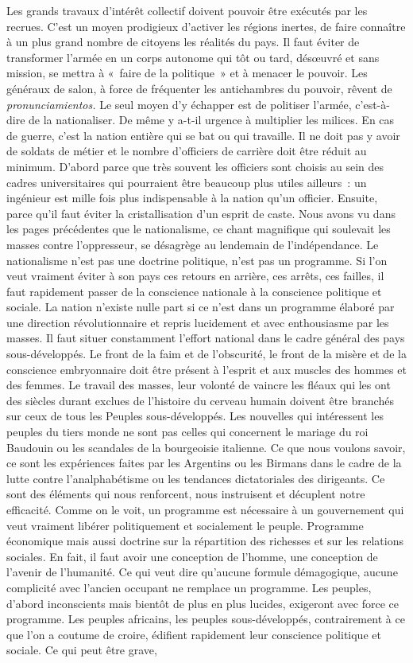 \documentclass[french,twoside]{book} %
\begin{document}
\noindent Les grands travaux d’intérêt collectif doivent pouvoir être exécutés par les recrues. C’est un moyen prodigieux d’activer les régions inertes, de faire connaître à un plus grand nombre de citoyens les réalités du pays. Il faut éviter de transformer l’armée en un corps autonome qui tôt ou tard, désœuvré et sans mission, se mettra à « faire de la politique » et à menacer le pouvoir. Les généraux de salon, à force de fréquenter les antichambres du pouvoir, rêvent de \emph{pronunciamientos.} Le seul moyen d’y échapper est de politiser l’armée, c’est-à-dire de la nationaliser. De même y a-t-il urgence à multiplier les milices. En cas de guerre, c’est la nation entière qui se bat ou qui travaille. Il ne doit pas y avoir de soldats de métier et le nombre d’officiers de carrière doit être réduit au minimum. D’abord parce que très souvent les officiers sont choisis au sein des cadres universitaires qui pourraient être beaucoup plus utiles ailleurs : un ingénieur est mille fois plus indispensable à la nation qu’un officier.   Ensuite, parce qu’il faut éviter la cristallisation d’un esprit de caste. Nous avons vu dans les pages précédentes que le nationalisme, ce chant magnifique qui soulevait les masses contre l’oppresseur, se désagrège au lendemain de l’indépendance. Le nationalisme n’est pas une doctrine politique, n’est pas un programme. Si l’on veut vraiment éviter à son pays ces retours en arrière, ces arrêts, ces failles, il faut rapidement passer de la conscience nationale à la conscience politique et sociale. La nation n’existe nulle part si ce n’est dans un programme élaboré par une direction révolutionnaire et repris lucidement et avec enthousiasme par les masses. Il faut situer constamment l’effort national dans le cadre général des pays sous-développés. Le front de la faim et de l’obscurité, le front de la misère et de la conscience embryonnaire doit être présent à l’esprit et aux muscles des hommes et des femmes. Le travail des masses, leur volonté de vaincre les fléaux qui les ont des siècles durant exclues de l’histoire du cerveau humain doivent être branchés sur ceux de tous les Peuples sous-développés. Les nouvelles qui intéressent les peuples du tiers monde ne sont pas celles qui concernent le mariage du roi Baudouin ou les scandales de la bourgeoisie italienne. Ce que nous voulons savoir, ce sont les expériences faites par les Argentins ou les Birmans dans le cadre de la lutte contre l’analphabétisme ou les tendances dictatoriales des dirigeants. Ce sont des éléments qui nous renforcent, nous instruisent et décuplent notre efficacité. Comme on le voit, un programme est nécessaire à un gouvernement qui veut vraiment libérer politiquement et socialement le peuple. Programme économique mais aussi doctrine sur la répartition des richesses et sur les relations sociales. En fait, il faut avoir une conception de l’homme, une conception de l’avenir de l’humanité. Ce qui veut dire qu’aucune formule démagogique, aucune complicité avec l’ancien occupant ne remplace un programme. Les peuples, d’abord inconscients mais bientôt de plus en plus lucides, exigeront avec force ce programme. Les peuples africains, les peuples sous-développés, contrairement à ce que l’on a coutume de croire, édifient rapidement leur conscience politique et   sociale. Ce qui peut être grave, 
\end{document}
